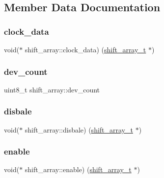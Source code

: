 \subsection{Member Data Documentation}
\mbox{\label{structshift__array_a705e01987c88536fbd23ff1e65842413}} 
\subsubsection{\texorpdfstring{clock\+\_\+data}{clock\_data}}
{\footnotesize\ttfamily void($\ast$  shift\+\_\+array\+::clock\+\_\+data) (\hyperlink{datatypes_8h_adb530ee69b7a28ad91cf00a7c665a2f5}{shift\+\_\+array\+\_\+t} $\ast$)}

\mbox{\label{structshift__array_a611f064ca0a91966cdf74bee3bbd70b7}} 
\subsubsection{\texorpdfstring{dev\+\_\+count}{dev\_count}}
{\footnotesize\ttfamily uint8\+\_\+t shift\+\_\+array\+::dev\+\_\+count}

\mbox{\label{structshift__array_a5abcf96f024b7ba533f93d250bad4ce9}} 
\subsubsection{\texorpdfstring{disbale}{disbale}}
{\footnotesize\ttfamily void($\ast$  shift\+\_\+array\+::disbale) (\hyperlink{datatypes_8h_adb530ee69b7a28ad91cf00a7c665a2f5}{shift\+\_\+array\+\_\+t} $\ast$)}

\mbox{\label{structshift__array_a37c7518b1c537f5abd8bedfdd8a328e0}} 
\subsubsection{\texorpdfstring{enable}{enable}}
{\footnotesize\ttfamily void($\ast$  shift\+\_\+array\+::enable) (\hyperlink{datatypes_8h_adb530ee69b7a28ad91cf00a7c665a2f5}{shift\+\_\+array\+\_\+t} $\ast$)}

